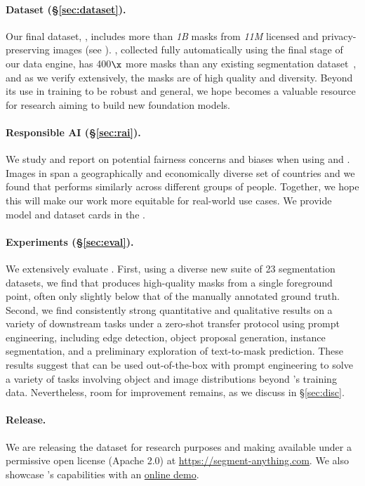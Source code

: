 \paragraph{Dataset (\S\ref{sec:dataset}).} Our final dataset, \sad, includes more than \emph{1B} masks from \emph{11M} licensed and privacy-preserving images (see ). \sad, collected fully automatically using the final stage of our data engine, has 400$\x$ more masks than any existing segmentation dataset~\cite{Lin2014,Gupta2019,Zhou2019,OpenImages}, and as we verify extensively, the masks are of high quality and diversity. Beyond its use in training \sam to be robust and general, we hope \sad becomes a valuable resource for research aiming to build new foundation models.

\paragraph{Responsible AI (\S\ref{sec:rai}).} We study and report on potential fairness concerns and biases when using \sad and \sam. Images in \sad span a geographically and economically diverse set of countries and we found that \sam performs similarly across different groups of people. Together, we hope this will make our work more equitable for real-world use cases. We provide model and dataset cards in the \supp.

\paragraph{Experiments (\S\ref{sec:eval}).} We extensively evaluate \sam. First, using a diverse new suite of 23 segmentation datasets, we find that \sam produces high-quality masks from a single foreground point, often only slightly below that of the manually annotated ground truth. Second, we find consistently strong quantitative and qualitative results on a variety of downstream tasks under a zero-shot transfer protocol using prompt engineering, including edge detection, object proposal generation, instance segmentation, and a preliminary exploration of text-to-mask prediction. These results suggest that \sam can be used out-of-the-box with prompt engineering to solve a variety of tasks involving object and image distributions beyond \sam's training data. Nevertheless, room for improvement remains, as we discuss in \S\ref{sec:disc}.

\paragraph{Release.} We are releasing the \sad dataset for research purposes and making \sam available under a permissive open license (Apache 2.0) at \href{https://segment-anything.com}{https://segment-anything.com}. We also showcase \sam's capabilities with an \href{https://segment-anything.com/demo}{online demo}.

